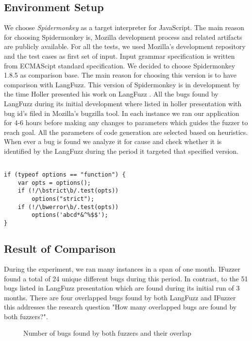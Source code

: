 \documentclass{acm_proc_article-sp}
\begin{document}
\subsection{Environment Setup}
We choose \textit{Spidermonkey} as a target interpreter for JavaScript. The main reason for choosing Spidermonkey is, Mozilla development process and related artifacts are publicly available. For all the tests, we used Mozilla's development repository and the test cases as first set of input. Input grammar specification is written from ECMAScipt standard specification. We decided to choose Spidermonkey 1.8.5 as comparison base. The main reason for choosing this version is to have comparison with LangFuzz. This version of Spidermonkey is in development by the time Holler presented his work on LangFuzz \cite{Holler11}. All the bugs found by LangFuzz during its initial development where listed in holler presentation with bug id's filed in Mozilla's bugzilla tool. In each instance we ran our application for 4-6 hours before making any changes to parameters which guides the fuzzer to reach goal. All the parameters of code generation are selected based on heuristics. When ever a bug is found we analyze it for cause and check whether it is identified by the LangFuzz during the period it targeted that specified version.  

\begin{lstlisting}

if (typeof options == "function") {
    var opts = options();
    if (!/\bstrict\b/.test(opts)) 
    	options("strict");
    if (!/\bwerror\b/.test(opts)) 
    	options('abcd*&^%$$');
}
\end{lstlisting}


\subsection{Result of Comparison}
During the experiment, we ran many instances in a span of one month. IFuzzer found  a total of 24 unique different bugs during this period. In contrast, to the 51 bugs listed in LangFuzz presentation which are found during its initial run of 3 months. There are four overlapped bugs found by both LangFuzz and IFuzzer this addresses the research question "How many overlapped bugs are found by both fuzzers?". 

\begin{figure}[h]
\centering
{}
\caption {Number of bugs found by both fuzzers and their overlap}
\label{fig5}
\end{figure}
\end{document}
